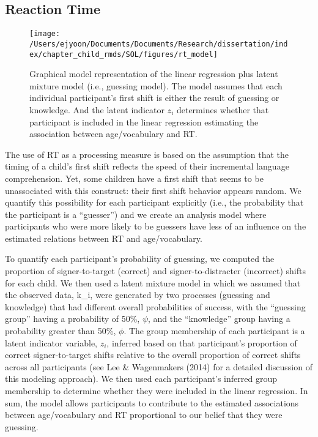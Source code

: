 \documentclass[oneside]{report}
\begin{document}
\subsection{Reaction Time}\label{reaction-time}
\begin{figure}[!t]

{\centering \texttt{[image: /Users/ejyoon/Documents/Documents/Research/dissertation/index/chapter\_child\_rmds/SOL/figures/rt\_model]} 

}

\caption[Graphical representation of the RT model in Experiment 1.1.]{Graphical model representation of the linear regression plus latent mixture model (i.e., guessing model). The model assumes that each individual participant's first shift is either the result of guessing or knowledge. And the latent indicator $z_i$ determines whether that participant is included in the linear regression estimating the association between age/vocabulary and RT.}\label{fig:unnamed-chunk-7}
\end{figure}
The use of RT as a processing measure is based on the assumption that
the timing of a child's first shift reflects the speed of their
incremental language comprehension. Yet, some children have a first
shift that seems to be unassociated with this construct: their first
shift behavior appears random. We quantify this possibility for each
participant explicitly (i.e., the probability that the participant is a
``guesser'') and we create an analysis model where participants who were
more likely to be guessers have less of an influence on the estimated
relations between RT and age/vocabulary.

To quantify each participant's probability of guessing, we computed the
proportion of signer-to-target (correct) and signer-to-distracter
(incorrect) shifts for each child. We then used a latent mixture model
in which we assumed that the observed data, k\_i, were generated by two
processes (guessing and knowledge) that had different overall
probabilities of success, with the ``guessing group'' having a
probability of 50\%, \(\psi\), and the ``knowledge'' group having a
probability greater than 50\%, \(\phi\). The group membership of each
participant is a latent indicator variable, \(z_i\), inferred based on
that participant's proportion of correct signer-to-target shifts
relative to the overall proportion of correct shifts across all
participants (see Lee \& Wagenmakers (2014) for a detailed discussion of
this modeling approach). We then used each participant's inferred group
membership to determine whether they were included in the linear
regression. In sum, the model allows participants to contribute to the
estimated associations between age/vocabulary and RT proportional to our
belief that they were guessing.
\end{document}
